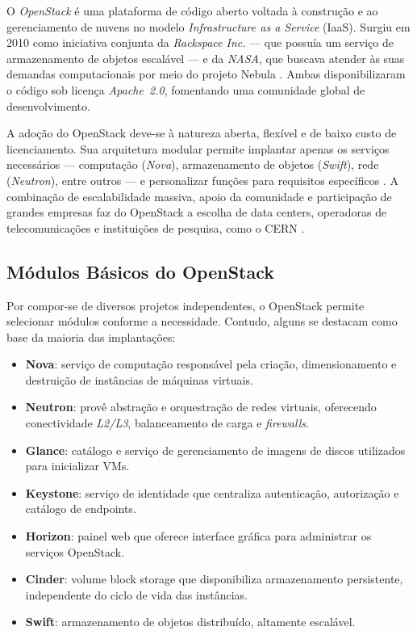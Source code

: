 O \textit{OpenStack} é uma plataforma de código aberto voltada à construção e ao gerenciamento de nuvens no modelo \textit{Infrastructure as a Service} (IaaS). Surgiu em 2010 como iniciativa conjunta da \textit{Rackspace Inc.} — que possuía um serviço de armazenamento de objetos escalável — e da \textit{NASA}, que buscava atender às suas demandas computacionais por meio do projeto Nebula \cite{nasa2012}. Ambas disponibilizaram o código sob licença \textit{Apache~2.0}, fomentando uma comunidade global de desenvolvimento.

A adoção do OpenStack deve-se à natureza aberta, flexível e de baixo custo de licenciamento. Sua arquitetura modular permite implantar apenas os serviços necessários — computação (\textit{Nova}), armazenamento de objetos (\textit{Swift}), rede (\textit{Neutron}), entre outros — e personalizar funções para requisitos específicos \cite{grzonka2015}. A combinação de escalabilidade massiva, apoio da comunidade e participação de grandes empresas faz do OpenStack a escolha de data centers, operadoras de telecomunicações e instituições de pesquisa, como o CERN \cite{rousseau2019}.

\subsection{Módulos Básicos do OpenStack}

Por compor-se de diversos projetos independentes, o OpenStack permite selecionar módulos conforme a necessidade. Contudo, alguns se destacam como base da maioria das implantações:

\begin{itemize}
    \item \textbf{Nova}: serviço de computação responsável pela criação, dimensionamento e destruição de instâncias de máquinas virtuais.
    \item \textbf{Neutron}: provê abstração e orquestração de redes virtuais, oferecendo conectividade \textit{L2/L3}, balanceamento de carga e \textit{firewalls}.
    \item \textbf{Glance}: catálogo e serviço de gerenciamento de imagens de discos utilizados para inicializar VMs.
    \item \textbf{Keystone}: serviço de identidade que centraliza autenticação, autorização e catálogo de endpoints.
    \item \textbf{Horizon}: painel web que oferece interface gráfica para administrar os serviços OpenStack.
    \item \textbf{Cinder}: volume block storage que disponibiliza armazenamento persistente, independente do ciclo de vida das instâncias.
    \item \textbf{Swift}: armazenamento de objetos distribuído, altamente escalável.
\end{itemize}

